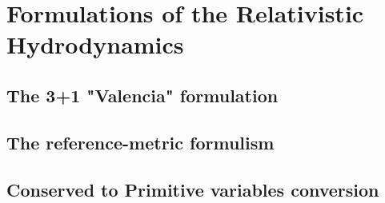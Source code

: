
\chapter{Formulations of the Relativistic Hydrodynamics}  %

\ifpdf
    \graphicspath{{Chapter3/Figs/PDF/}{Chapter3/Figs/}}
\else
    \graphicspath{{Chapter3/Figs/}}
\fi


\section{The 3+1 "Valencia" formulation} %
\label{section3.1}

\section{The reference-metric formulism} %
\label{section3.2}

\section{Conserved to Primitive variables conversion}  %
\label{section3.3}


